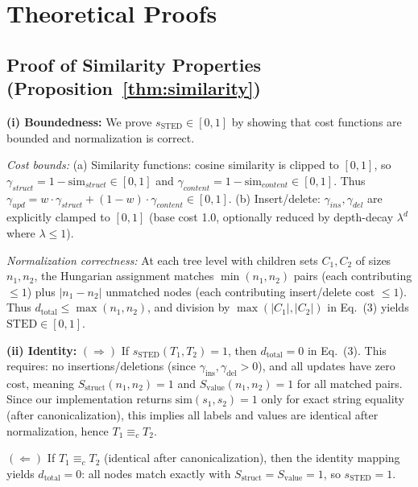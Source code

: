 \documentclass{article}
\theoremstyle{plain}
\theoremstyle{definition}
\begin{document}
\appendix
\section{Theoretical Proofs}
\label{sec:proofs}

\subsection{Proof of Similarity Properties (Proposition~\ref{thm:similarity})}
\label{sec:similarity-proof}

\textbf{(i) Boundedness:} We prove $s_{\text{STED}} \in [0,1]$ by showing that cost functions are bounded and normalization is correct.

\textit{Cost bounds:} (a) Similarity functions: cosine similarity is clipped to $[0,1]$, so $\gamma_{struct} = 1 - \text{sim}_{struct} \in [0,1]$ and $\gamma_{content} = 1 - \text{sim}_{content} \in [0,1]$. Thus $\gamma_{upd} = w \cdot \gamma_{struct} + (1-w) \cdot \gamma_{content} \in [0,1]$. (b) Insert/delete: $\gamma_{ins}, \gamma_{del}$ are explicitly clamped to $[0,1]$ (base cost 1.0, optionally reduced by depth-decay $\lambda^d$ where $\lambda \leq 1$).

\textit{Normalization correctness:} At each tree level with children sets $C_1, C_2$ of sizes $n_1, n_2$, the Hungarian assignment matches $\min(n_1, n_2)$ pairs (each contributing $\leq 1$) plus $|n_1 - n_2|$ unmatched nodes (each contributing insert/delete cost $\leq 1$). Thus $d_{\text{total}} \leq \max(n_1, n_2)$, and division by $\max(|C_1|, |C_2|)$ in Eq.~(3) yields $\text{STED} \in [0,1]$.

\textbf{(ii) Identity:}
$(\Rightarrow)$ If $s_{\text{STED}}(T_1, T_2) = 1$, then $d_{\text{total}} = 0$ in Eq.~(3). This requires: no insertions/deletions (since $\gamma_{\text{ins}}, \gamma_{\text{del}} > 0$), and all updates have zero cost, meaning $S_{\text{struct}}(n_1, n_2) = 1$ and $S_{\text{value}}(n_1, n_2) = 1$ for all matched pairs. Since our implementation returns $\text{sim}(s_1, s_2) = 1$ only for exact string equality (after canonicalization), this implies all labels and values are identical after normalization, hence $T_1 \equiv_c T_2$.

$(\Leftarrow)$ If $T_1 \equiv_c T_2$ (identical after canonicalization), then the identity mapping yields $d_{\text{total}} = 0$: all nodes match exactly with $S_{\text{struct}} = S_{\text{value}} = 1$, so $s_{\text{STED}} = 1$.
\end{document}
